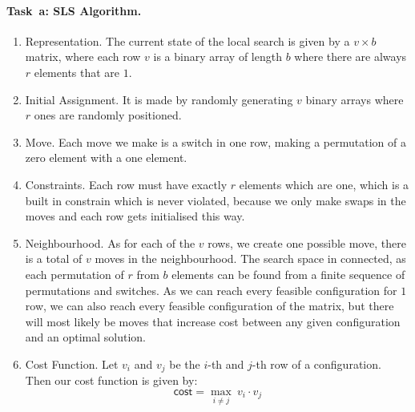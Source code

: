\paragraph{Task~a: SLS Algorithm.}
\begin{enumerate}
\item Representation. 
The current state of the local search is given by a $v \times b$ matrix, where each row $v$ is a binary array of length $b$ where there are always $r$ elements that are $1$. 

  
\item Initial Assignment. It is made by randomly generating $v$ binary arrays where $r$ ones are randomly positioned. %
\item Move. Each move we make is a switch in one row, making a permutation of a zero element with a one element.
\item Constraints. Each row must have exactly $r$ elements which are one, which is a built in constrain which is never violated, because we only make swaps in the moves and each row gets initialised this way. 
\item Neighbourhood. As for each of the $v$ rows, we create one possible move, there is a total of $v$ moves in the neighbourhood. The search space in connected, as each permutation of $r$ from $b$ elements can be found from a finite sequence of permutations and switches. As we can reach every feasible configuration for $1$ row, we can also reach every feasible configuration of the matrix, but there will most likely be moves that increase cost between any given configuration and an optimal solution. 
\item Cost Function. Let $v_i$ and $v_j$ be the $i$-th and $j$-th row of a configuration. Then our cost function is given by: 
\begin{equation*}
 \mathsf{cost} = \max_{i \neq j}\: v_i \cdot v_j 
\end{equation*}


\end{enumerate}
